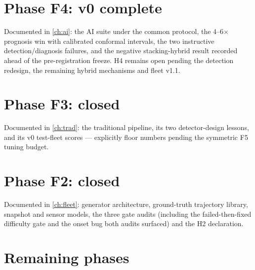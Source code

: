 \section{Phase F4: v0 complete}

Documented in \cref{ch:ai}: the AI suite under the common protocol, the 4--6$\times$
prognosis win with calibrated conformal intervals, the two instructive detection/diagnosis
failures, and the negative stacking-hybrid result recorded ahead of the pre-registration
freeze. H4 remains open pending the detection redesign, the remaining hybrid mechanisms and
fleet v1.1.

\section{Phase F3: closed}

Documented in \cref{ch:trad}: the traditional pipeline, its two detector-design lessons, and
its v0 test-fleet scores --- explicitly floor numbers pending the symmetric F5 tuning budget.

\section{Phase F2: closed}

Documented in \cref{ch:fleet}: generator architecture, ground-truth trajectory library,
snapshot and sensor models, the three gate audits (including the failed-then-fixed difficulty
gate and the onset bug both audits surfaced) and the H2 declaration.

\section{Remaining phases}

